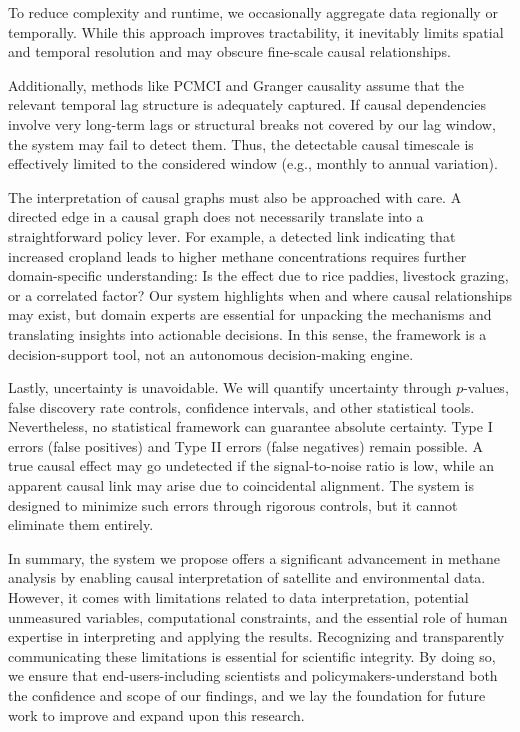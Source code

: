 To reduce complexity and runtime, we occasionally aggregate data regionally or temporally. While this approach improves tractability, it inevitably limits spatial and temporal resolution and may obscure fine-scale causal relationships.

Additionally, methods like PCMCI and Granger causality assume that the relevant temporal lag structure is adequately captured. If causal dependencies involve very long-term lags or structural breaks not covered by our lag window, the system may fail to detect them. Thus, the detectable causal timescale is effectively limited to the considered window (e.g., monthly to annual variation).

The interpretation of causal graphs must also be approached with care. A directed edge in a causal graph does not necessarily translate into a straightforward policy lever. For example, a detected link indicating that increased cropland leads to higher methane concentrations requires further domain-specific understanding: Is the effect due to rice paddies, livestock grazing, or a correlated factor? Our system highlights when and where causal relationships may exist, but domain experts are essential for unpacking the mechanisms and translating insights into actionable decisions. In this sense, the framework is a decision-support tool, not an autonomous decision-making engine.

Lastly, uncertainty is unavoidable. We will quantify uncertainty through $p$-values, false discovery rate controls, confidence intervals, and other statistical tools. Nevertheless, no statistical framework can guarantee absolute certainty. Type I errors (false positives) and Type II errors (false negatives) remain possible. A true causal effect may go undetected if the signal-to-noise ratio is low, while an apparent causal link may arise due to coincidental alignment. The system is designed to minimize such errors through rigorous controls, but it cannot eliminate them entirely.

In summary, the system we propose offers a significant advancement in methane analysis by enabling causal interpretation of satellite and environmental data. However, it comes with limitations related to data interpretation, potential unmeasured variables, computational constraints, and the essential role of human expertise in interpreting and applying the results. Recognizing and transparently communicating these limitations is essential for scientific integrity. By doing so, we ensure that end-users-including scientists and policymakers-understand both the confidence and scope of our findings, and we lay the foundation for future work to improve and expand upon this research.

